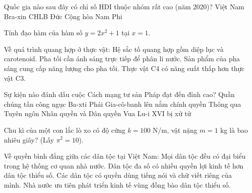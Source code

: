 \begin{ex}
    Quốc gia nào sau đây có chỉ số HDI thuộc nhóm rất cao (năm 2020)?
    \choice
    {Việt Nam}
    {Bra-xin}
    {\True CHLB Đức}
    {Cộng hòa Nam Phi}
\end{ex}

\begin{ex}
    Tính đạo hàm của hàm số $y = 2x^2 + 1$ tại $x = 1$.
\end{ex}

\begin{ex}
    Về quá trình quang hợp ở thực vật:
    \choiceTF
    {\True Hệ sắc tố quang hợp gồm diệp lục và carotenoid.}
    {Pha tối cần ánh sáng trực tiếp để phân li nước.}
    {\True Sản phẩm của pha sáng cung cấp năng lượng cho pha tối.}
    {Thực vật C4 có năng suất thấp hơn thực vật C3.}
\end{ex}

\begin{ex}
    Sự kiện nào đánh dấu cuộc Cách mạng tư sản Pháp đạt đến đỉnh cao?
    \choice
    {Quần chúng tấn công ngục Ba-xti}
    {\True Phái Gia-cô-banh lên nắm chính quyền}
    {Thông qua Tuyên ngôn Nhân quyền và Dân quyền}
    {Vua Lu-i XVI bị xử tử}
\end{ex}

\begin{ex}
    Chu kì của một con lắc lò xo có độ cứng $k=100$ N/m, vật nặng $m=1$ kg là bao nhiêu giây? (Lấy $\pi^2 = 10$).
\end{ex}

\begin{ex}
    Về quyền bình đẳng giữa các dân tộc tại Việt Nam:
    \choiceTF
    {\True Mọi dân tộc đều có đại biểu trong hệ thống cơ quan nhà nước.}
    {Dân tộc đa số có nhiều quyền lợi kinh tế hơn dân tộc thiểu số.}
    {\True Các dân tộc có quyền dùng tiếng nói và chữ viết riêng của mình.}
    {\True Nhà nước ưu tiên phát triển kinh tế vùng đồng bào dân tộc thiểu số.}
\end{ex}

